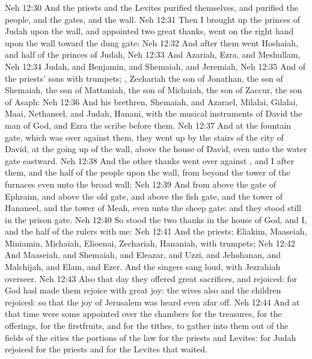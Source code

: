 \vs Neh 12:30 And the priests and the Levites purified themselves, and purified the people, and the gates, and the wall.
\vs Neh 12:31 Then I brought up the princes of Judah upon the wall, and appointed two great  thanks,  went on the right hand upon the wall toward the dung gate:
\vs Neh 12:32 And after them went Hoshaiah, and half of the princes of Judah,
\vs Neh 12:33 And Azariah, Ezra, and Meshullam,
\vs Neh 12:34 Judah, and Benjamin, and Shemaiah, and Jeremiah,
\vs Neh 12:35 And  of the priests' sons with trumpets; , Zechariah the son of Jonathan, the son of Shemaiah, the son of Mattaniah, the son of Michaiah, the son of Zaccur, the son of Asaph:
\vs Neh 12:36 And his brethren, Shemaiah, and Azarael, Milalai, Gilalai, Maai, Nethaneel, and Judah, Hanani, with the musical instruments of David the man of God, and Ezra the scribe before them.
\vs Neh 12:37 And at the fountain gate, which was over against them, they went up by the stairs of the city of David, at the going up of the wall, above the house of David, even unto the water gate eastward.
\vs Neh 12:38 And the other  thanks went over against , and I after them, and the half of the people upon the wall, from beyond the tower of the furnaces even unto the broad wall;
\vs Neh 12:39 And from above the gate of Ephraim, and above the old gate, and above the fish gate, and the tower of Hananeel, and the tower of Meah, even unto the sheep gate: and they stood still in the prison gate.
\vs Neh 12:40 So stood the two  thanks in the house of God, and I, and the half of the rulers with me:
\vs Neh 12:41 And the priests; Eliakim, Maaseiah, Miniamin, Michaiah, Elioenai, Zechariah,  Hananiah, with trumpets;
\vs Neh 12:42 And Maaseiah, and Shemaiah, and Eleazar, and Uzzi, and Jehohanan, and Malchijah, and Elam, and Ezer. And the singers sang loud, with Jezrahiah  overseer.
\vs Neh 12:43 Also that day they offered great sacrifices, and rejoiced: for God had made them rejoice with great joy: the wives also and the children rejoiced: so that the joy of Jerusalem was heard even afar off.
\vs Neh 12:44 And at that time were some appointed over the chambers for the treasures, for the offerings, for the firstfruits, and for the tithes, to gather into them out of the fields of the cities the portions of the law for the priests and Levites: for Judah rejoiced for the priests and for the Levites that waited.
